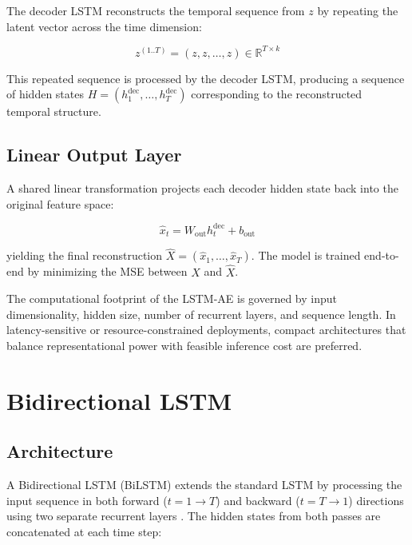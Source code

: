 The decoder LSTM reconstructs the temporal sequence from $z$ by repeating the latent
vector across the time dimension:

\begin{equation}
    z^{(1..T)} = (z, z, \ldots, z) \in \mathbb{R}^{T \times k}
\end{equation}

\noindent This repeated sequence is processed by the decoder LSTM, producing a sequence
of hidden states $H = (h_1^{\text{dec}}, \ldots, h_T^{\text{dec}})$ corresponding to
the reconstructed temporal structure.

\subsection{Linear Output Layer}
\label{subsec:linear_layer}

A shared linear transformation projects each decoder hidden state back into the
original feature space:

\begin{equation}
    \hat{x}_t = W_{\text{out}} h_t^{\text{dec}} + b_{\text{out}}
    \label{eq:linear_output}
\end{equation}

\noindent yielding the final reconstruction $\hat{X} = (\hat{x}_1, \ldots, \hat{x}_T)$.
The model is trained end-to-end by minimizing the MSE between $X$ and $\hat{X}$.

The computational footprint of the LSTM-AE is governed by input dimensionality, hidden
size, number of recurrent layers, and sequence length. In latency-sensitive or
resource-constrained deployments, compact architectures that balance representational
power with feasible inference cost are preferred.

\section{Bidirectional LSTM}
\label{sec:bilstm}

\subsection{Architecture}
\label{subsec:bilstm_arch}

A Bidirectional LSTM (BiLSTM) extends the standard LSTM by processing the input
sequence in both forward ($t = 1 \rightarrow T$) and backward ($t = T \rightarrow 1$)
directions using two separate recurrent layers \cite{graves2005framewise,
schuster1997bidirectional}. The hidden states from both passes are concatenated at each
time step:

